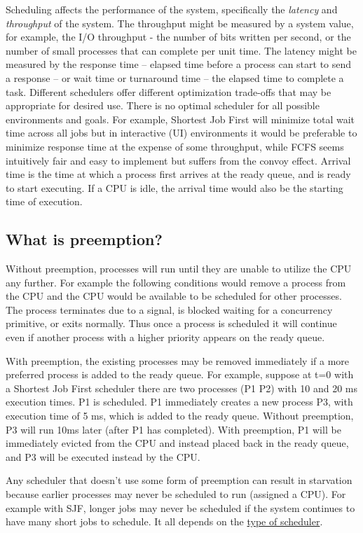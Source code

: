 Scheduling affects the performance of the system, specifically the \emph{latency} and \emph{throughput} of the system.
The throughput might be measured by a system value, for example, the I/O throughput - the number of bits written per second, or the number of small processes that can complete per unit time.
The latency might be measured by the response time -- elapsed time before a process can start to send a response -- or wait time or turnaround time -- the elapsed time to complete a task.
Different schedulers offer different optimization trade-offs that may be appropriate for desired use.
There is no optimal scheduler for all possible environments and goals.
For example, Shortest Job First will minimize total wait time across all jobs but in interactive (UI) environments it would be preferable to minimize response time at the expense of some throughput, while FCFS seems intuitively fair and easy to implement but suffers from the convoy effect.
Arrival time is the time at which a process first arrives at the ready queue, and is ready to start executing.
If a CPU is idle, the arrival time would also be the starting time of execution.

\subsection{What is preemption?}

Without preemption, processes will run until they are unable to utilize the CPU any further.
For example the following conditions would remove a process from the CPU and the CPU would be available to be scheduled for other processes.
The process terminates due to a signal, is blocked waiting for a concurrency primitive, or exits normally.
Thus once a process is scheduled it will continue even if another process with a higher priority appears on the ready queue.

With preemption, the existing processes may be removed immediately if a more preferred process is added to the ready queue.
For example, suppose at t=0 with a Shortest Job First scheduler there are two processes (P1 P2) with 10 and 20 ms execution times.
P1 is scheduled.
P1 immediately creates a new process P3, with execution time of 5 ms, which is added to the ready queue.
Without preemption, P3 will run 10ms later (after P1 has completed).
With preemption, P1 will be immediately evicted from the CPU and instead placed back in the ready queue, and P3 will be executed instead by the CPU.

Any scheduler that doesn't use some form of preemption can result in starvation because earlier processes may never be scheduled to run (assigned a CPU).
For example with SJF, longer jobs may never be scheduled if the system continues to have many short jobs to schedule.
It all depends on the \href{https://en.wikipedia.org/wiki/Scheduling_(computing)\#Types_of_operating_system_schedulers}{type of scheduler}.

